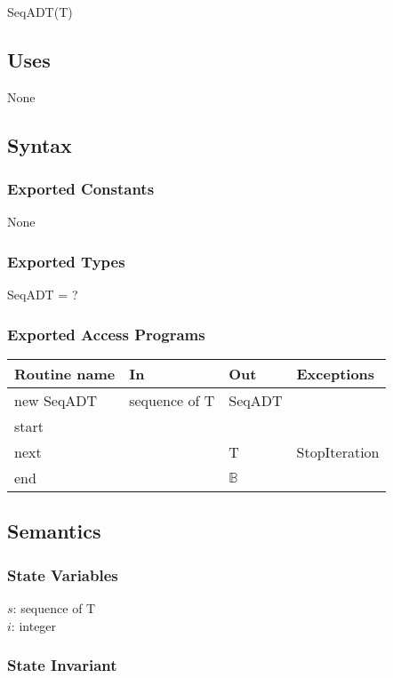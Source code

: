 \documentclass[12pt]{article}
\begin{document}
SeqADT(T)

\subsection* {Uses}

None

\subsection* {Syntax}

\subsubsection* {Exported Constants}

None

\subsubsection* {Exported Types}

SeqADT = ?

\subsubsection* {Exported Access Programs}

\begin{tabular}{| l | l | l | p{5cm} |}
\hline
\textbf{Routine name} & \textbf{In} & \textbf{Out} & \textbf{Exceptions}\\
\hline
new SeqADT & sequence of T & SeqADT & ~\\
\hline
start & ~ & ~ & ~\\
\hline
next & ~ & T & StopIteration\\
\hline
end & ~ & $\mathbb{B}$ & ~\\
\hline
\end{tabular}

\subsection* {Semantics}

\subsubsection* {State Variables}

$s$: sequence of T\\
$i$: integer

\subsubsection* {State Invariant}
\end{document}
